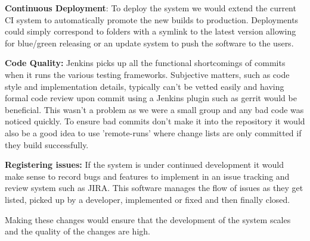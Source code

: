 \documentclass[a4paper,11pt]{article}
\begin{document}
\textbf{Continuous Deployment}: To deploy the system we would extend the current CI system to automatically promote the new builds to production. Deployments could simply correspond to folders with a symlink to the latest version allowing for blue/green releasing or an update system to push the software to the users.

\textbf{Code Quality:} Jenkins picks up all the functional shortcomings of commits when it runs the various testing frameworks. Subjective matters, such as code style and implementation details, typically can't be vetted easily and having formal code review upon commit using a Jenkins plugin such as gerrit would be beneficial. This wasn't a problem as we were a small group and any bad code was noticed quickly. To ensure bad commits don't make it into the repository it would also be a good idea to use 'remote-runs' where change lists are only committed if they build successfully.

\textbf{Registering issues:} If the system is under continued development it would make sense to record bugs and features to implement in an issue tracking and review system such as JIRA. This software manages the flow of issues as they get listed, picked up by a developer, implemented or fixed and then finally closed. 

Making these changes would ensure that the development of the system scales and the quality of the changes are high.
\end{document}
